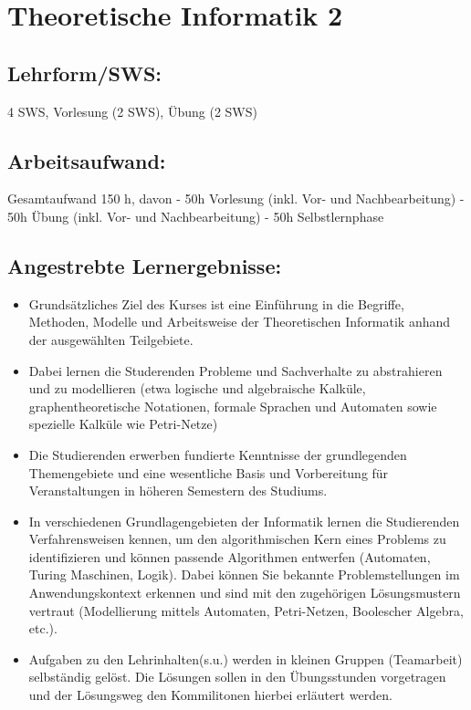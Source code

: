 \chapter{Theoretische Informatik 2}\label{theoretische-informatik-2}

\section{Lehrform/SWS:}\label{lehrformsws-23}

4 SWS, Vorlesung (2 SWS), Übung (2 SWS)

\section{Arbeitsaufwand:}\label{arbeitsaufwand-23}

Gesamtaufwand 150 h, davon - 50h Vorlesung (inkl. Vor- und
Nachbearbeitung) - 50h Übung (inkl. Vor- und Nachbearbeitung) - 50h
Selbstlernphase

\section{Angestrebte
Lernergebnisse:}\label{angestrebte-lernergebnisse-28}

\begin{itemize}
\item
  Grundsätzliches Ziel des Kurses ist eine Einführung in die Begriffe,
  Methoden, Modelle und Arbeitsweise der Theoretischen Informatik anhand
  der ausgewählten Teilgebiete.
\item
  Dabei lernen die Studerenden Probleme und Sachverhalte zu abstrahieren
  und zu modellieren (etwa logische und algebraische Kalküle,
  graphentheoretische Notationen, formale Sprachen und Automaten sowie
  spezielle Kalküle wie Petri-Netze)
\item
  Die Studierenden erwerben fundierte Kenntnisse der grundlegenden
  Themengebiete und eine wesentliche Basis und Vorbereitung für
  Veranstaltungen in höheren Semestern des Studiums.
\item
  In verschiedenen Grundlagengebieten der Informatik lernen die
  Studierenden Verfahrensweisen kennen, um den algorithmischen Kern
  eines Problems zu identifizieren und können passende Algorithmen
  entwerfen (Automaten, Turing Maschinen, Logik). Dabei können Sie
  bekannte Problemstellungen im Anwendungskontext erkennen und sind mit
  den zugehörigen Lösungsmustern vertraut (Modellierung mittels
  Automaten, Petri-Netzen, Boolescher Algebra, etc.).
\item
  Aufgaben zu den Lehrinhalten(s.u.) werden in kleinen Gruppen
  (Teamarbeit) selbständig gelöst. Die Lösungen sollen in den
  Übungsstunden vorgetragen und der Lösungsweg den Kommilitonen hierbei
  erläutert werden.
\end{itemize}


